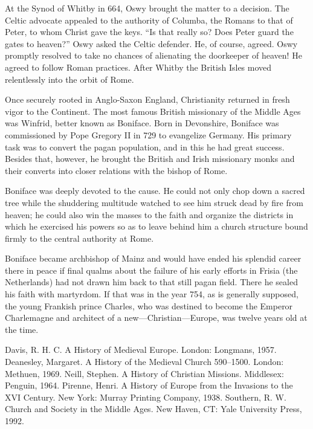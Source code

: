 At the Synod of Whitby in 664, Oswy brought the matter to a decision. The Celtic advocate appealed
to the authority of Columba, the Romans to that of Peter, to whom Christ gave the keys. “Is that
really so? Does Peter guard the gates to heaven?” Oswy asked the Celtic defender. He, of course,
agreed. Oswy promptly resolved to take no chances of alienating the doorkeeper of heaven! He agreed
to follow Roman practices. After Whitby the British Isles moved relentlessly into the orbit of Rome.

Once securely rooted in Anglo-Saxon England, Christianity returned in fresh vigor to the Continent.
The most famous British missionary of the Middle Ages was Winfrid, better known as Boniface. Born in
Devonshire, Boniface was commissioned by Pope Gregory II in 729 to evangelize Germany. His primary
task was to convert the pagan population, and in this he had great success. Besides that, however,
he brought the British and Irish missionary monks and their converts into closer relations with the
bishop of Rome.

Boniface was deeply devoted to the cause. He could not only chop down a sacred tree while the
shuddering multitude watched to see him struck dead by fire from heaven; he could also win the
masses to the faith and organize the districts in which he exercised his powers so as to leave
behind him a church structure bound firmly to the central authority at Rome.

Boniface became archbishop of Mainz and would have ended his splendid career there in peace if final
qualms about the failure of his early efforts in Frisia (the Netherlands) had not drawn him back to
that still pagan field. There he sealed his faith with martyrdom. If that was in the year 754, as is
generally supposed, the young Frankish prince Charles, who was destined to become the Emperor
Charlemagne and architect of a new—Christian—Europe, was twelve years old at the time.

\begin{readinglist}
\entry Davis, R. H. C. A History of Medieval Europe. London: Longmans, 1957.
\entry Deanesley, Margaret. A History of the Medieval Church 590–1500. London: Methuen, 1969.
\entry Neill, Stephen. A History of Christian Missions. Middlesex: Penguin, 1964.
\entry Pirenne, Henri. A History of Europe from the Invasions to the XVI Century. New York: Murray
  Printing Company, 1938.
\entry *Southern, R. W. Church and Society in the Middle Ages. New Haven, CT: Yale University Press,
  1992.
\end{readinglist}
